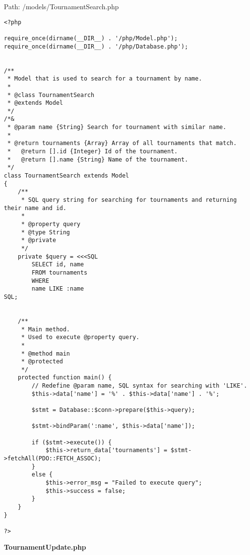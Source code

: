 Path: /models/TournamentSearch.php
{\scriptsize
\begin{lstlisting}
<?php

require_once(dirname(__DIR__) . '/php/Model.php');
require_once(dirname(__DIR__) . '/php/Database.php');


/**
 * Model that is used to search for a tournament by name.
 *
 * @class TournamentSearch
 * @extends Model
 */
/*&
 * @param name {String} Search for tournament with similar name.
 *
 * @return tournaments {Array} Array of all tournaments that match.
 *   @return [].id {Integer} Id of the tournament.
 *   @return [].name {String} Name of the tournament.
 */
class TournamentSearch extends Model
{
	/**
	 * SQL query string for searching for tournaments and returning their name and id.
	 *
	 * @property query
	 * @type String
	 * @private
	 */
	private $query = <<<SQL
		SELECT id, name
		FROM tournaments
		WHERE
		name LIKE :name
SQL;


	/**
	 * Main method.
	 * Used to execute @property query.
	 *
	 * @method main
	 * @protected
	 */
	protected function main() {
		// Redefine @param name, SQL syntax for searching with 'LIKE'.
		$this->data['name'] = '%' . $this->data['name'] . '%';

		$stmt = Database::$conn->prepare($this->query);

		$stmt->bindParam(':name', $this->data['name']);

		if ($stmt->execute()) {
			$this->return_data['tournaments'] = $stmt->fetchAll(PDO::FETCH_ASSOC);
		}
		else {
			$this->error_msg = "Failed to execute query";
			$this->success = false;
		}
	}
}

?>\end{lstlisting}
}
\textbf{TournamentUpdate.php}\label{TournamentUpdate.php}

